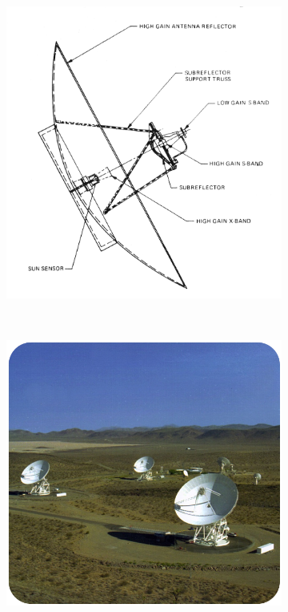 \documentclass[11pt,a4paper]{article}
\begin{document}
\begin{figure}[hb]
        \centering
        \begin{subfigure}[b]{0.4\textwidth}
                \includegraphics[width=\textwidth]{./voyagerantenna}
                \caption{}
        \end{subfigure}%
        ~ \quad %
        \begin{subfigure}[b]{0.4\textwidth}
                \includegraphics[width=\textwidth]{./antennaearth}
                \caption{}
        \end{subfigure}
       
        \caption{}
\end{figure}
\end{document}
